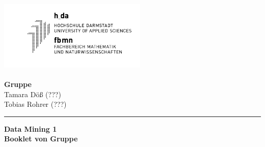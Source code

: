 \hspace{-1.4cm}
\parbox[b][80pt][b]{80pt}{
	\includegraphics[width=200pt,height=100pt]{Bilder/hda_fbmn.png}}
\hfill
\parbox[b][75pt][t]{260pt}{
	\hspace*{\fill}\textbf{Gruppe \Gruppe} \\ 
	\hspace*{\fill} Tamara Döß (???) \\
	\hspace*{\fill} Tobias Rohrer (???)\\
	\hspace*{\fill} }
\vspace{-0.2cm}
\hrule
\vspace{5mm}
\begin{center}
	{\bf\huge Data Mining 1\\[10mm]}
	{\bf \large Booklet von Gruppe \Gruppe}
\end{center}
\vspace{1cm}
\tableofcontents
\pagebreak
\addtocounter{secnumdepth}{-1}
